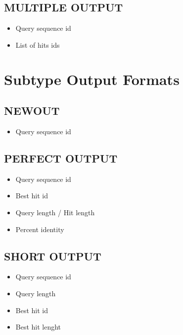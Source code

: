 \documentclass[letterpaper,10pt,english]{sphinxmanual}
\begin{document}
\subsection{MULTIPLE OUTPUT}
\label{defs:multipleout}\label{defs:multiple-output}\begin{itemize}
\item {} 
Query sequence id

\item {} 
List of hits ids

\end{itemize}


\section{Subtype Output Formats}
\label{defs:subtype-output-formats}

\subsection{NEWOUT}
\label{defs:newout}\label{defs:id11}\begin{itemize}
\item {} 
Query sequence id

\end{itemize}


\subsection{PERFECT OUTPUT}
\label{defs:perfect-output}\label{defs:perfectout}\begin{itemize}
\item {} 
Query sequence id

\item {} 
Best hit id

\item {} 
Query length / Hit length

\item {} 
Percent identity

\end{itemize}


\subsection{SHORT OUTPUT}
\label{defs:short-output}\label{defs:shortout}\begin{itemize}
\item {} 
Query sequence id

\item {} 
Query length

\item {} 
Best hit id

\item {} 
Best hit lenght

\end{itemize}
\end{document}
